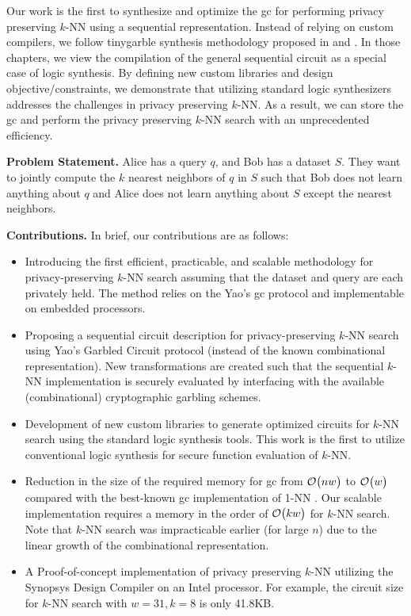 Our work is the first to synthesize and optimize the \acrshort{gc} for performing privacy preserving $k$-NN using a sequential representation.
Instead of relying on custom compilers, we follow \gls{tinygarble} synthesis methodology proposed in  and .
In those chapters, we view the compilation of the general sequential circuit as a special case of logic synthesis.
By defining new custom libraries and design objective/constraints, we demonstrate that utilizing standard logic synthesizers addresses the challenges in privacy preserving $k$-NN.
As a result, we can store the \acrshort{gc} and perform the privacy preserving $k$-NN search with an unprecedented efficiency.

\textbf{Problem Statement.} Alice has a query $q$, and Bob has a dataset $S$.
They want to jointly compute the $k$ nearest neighbors of $q$ in $S$ such that Bob does not learn anything about $q$ and Alice does not learn anything about $S$ except the nearest neighbors.

\textbf{Contributions.} In brief, our contributions are as follows:

\begin{itemize}
  \item Introducing the first efficient, practicable, and scalable methodology for privacy-preserving $k$-NN search assuming that the dataset and query are each privately held.
  The method relies on the Yao's \acrshort{gc} protocol and implementable on embedded processors.

  \item Proposing a sequential circuit description for privacy-preserving $k$-NN search using Yao's Garbled Circuit protocol (instead of the known combinational representation).
  New transformations are created such that the sequential $k$-NN implementation is securely evaluated by interfacing with the available (combinational) cryptographic garbling schemes.

  \item Development of new custom libraries to generate optimized circuits for $k$-NN search using the standard logic synthesis tools.
  This work is the first to utilize conventional logic synthesis for secure function evaluation of $k$-NN.

  \item Reduction in the size of the required memory for \acrshort{gc} from $\mathcal{O}\bigl(nw\bigr)$ to $\mathcal{O}\bigl(w\bigr)$ compared with the best-known \acrshort{gc} implementation of 1-NN \cite{kolesnikov2009improved}.
  Our scalable implementation requires a memory in the order of $\mathcal{O}\bigl(kw\bigr)$ for $k$-NN search.
  Note that $k$-NN search was impracticable earlier (for large $n$) due to the linear growth of the combinational representation.

  \item A Proof-of-concept implementation of privacy preserving $k$-NN utilizing the Synopsys Design Compiler on an Intel processor.
  For example, the circuit size for $k$-NN search with $w=31, k=8$ is only 41.8KB.
\end{itemize}

